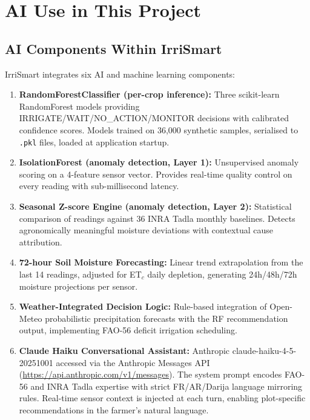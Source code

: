 \documentclass[12pt,a4paper]{report}
\begin{document}
\chapter{AI Use in This Project}

\section{AI Components Within IrriSmart}

IrriSmart integrates six AI and machine learning components:

\begin{enumerate}
  \item \textbf{RandomForestClassifier (per-crop inference):} Three scikit-learn RandomForest models providing IRRIGATE/WAIT/NO\_ACTION/MONITOR decisions with calibrated confidence scores. Models trained on 36,000 synthetic samples, serialised to \texttt{.pkl} files, loaded at application startup.
  \item \textbf{IsolationForest (anomaly detection, Layer 1):} Unsupervised anomaly scoring on a 4-feature sensor vector. Provides real-time quality control on every reading with sub-millisecond latency.
  \item \textbf{Seasonal Z-score Engine (anomaly detection, Layer 2):} Statistical comparison of readings against 36 INRA Tadla monthly baselines. Detects agronomically meaningful moisture deviations with contextual cause attribution.
  \item \textbf{72-hour Soil Moisture Forecasting:} Linear trend extrapolation from the last 14 readings, adjusted for ET$_c$ daily depletion, generating 24h/48h/72h moisture projections per sensor.
  \item \textbf{Weather-Integrated Decision Logic:} Rule-based integration of Open-Meteo probabilistic precipitation forecasts with the RF recommendation output, implementing FAO-56 deficit irrigation scheduling.
  \item \textbf{Claude Haiku Conversational Assistant:} Anthropic claude-haiku-4-5-20251001 accessed via the Anthropic Messages API (\url{https://api.anthropic.com/v1/messages}). The system prompt encodes FAO-56 and INRA Tadla expertise with strict FR/AR/Darija language mirroring rules. Real-time sensor context is injected at each turn, enabling plot-specific recommendations in the farmer's natural language.
\end{enumerate}
\end{document}
